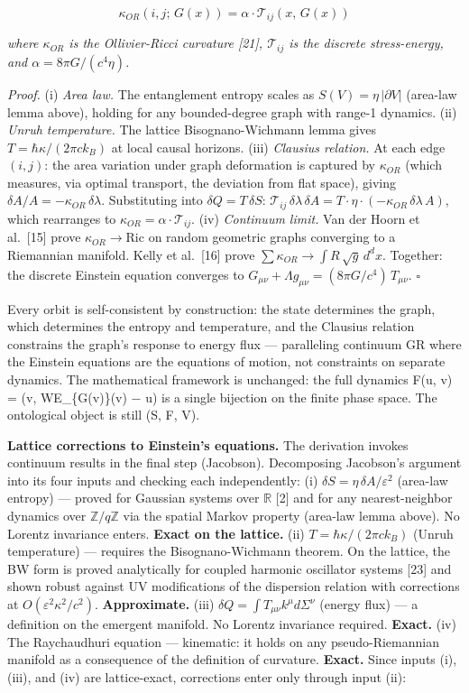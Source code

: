 \documentclass[
  11pt,
]{article}
\begin{document}
\[\kappa_{OR}(i, j;\, G(x)) = \alpha \cdot \mathcal{T}_{ij}(x,\, G(x))\]

\emph{where \(\kappa_{OR}\) is the Ollivier-Ricci curvature {[}21{]},
\(\mathcal{T}_{ij}\) is the discrete stress-energy, and
\(\alpha = 8\pi G/(c^4 \eta)\).}

\emph{Proof.} (i) \emph{Area law.} The entanglement entropy scales as
\(S(V) = \eta\,|\partial V|\) (area-law lemma above), holding for any
bounded-degree graph with range-1 dynamics. (ii) \emph{Unruh
temperature.} The lattice Bisognano-Wichmann lemma gives
\(T = \hbar\kappa/(2\pi c k_B)\) at local causal horizons. (iii)
\emph{Clausius relation.} At each edge \((i,j)\): the area variation
under graph deformation is captured by \(\kappa_{OR}\) (which measures,
via optimal transport, the deviation from flat space), giving
\(\delta A / A = -\kappa_{OR}\,\delta\lambda\). Substituting into
\(\delta Q = T\,\delta S\):
\(\mathcal{T}_{ij}\,\delta\lambda\,\delta A = T \cdot \eta \cdot (-\kappa_{OR}\,\delta\lambda\,A)\),
which rearranges to \(\kappa_{OR} = \alpha \cdot \mathcal{T}_{ij}\).
(iv) \emph{Continuum limit.} Van der Hoorn et al.~{[}15{]} prove
\(\kappa_{OR} \to \mathrm{Ric}\) on random geometric graphs converging
to a Riemannian manifold. Kelly et al.~{[}16{]} prove
\(\sum \kappa_{OR} \to \int R\,\sqrt{g}\,d^dx\). Together: the discrete
Einstein equation converges to
\(G_{\mu\nu} + \Lambda g_{\mu\nu} = (8\pi G/c^4)\,T_{\mu\nu}\).
\(\square\)

Every orbit is self-consistent by construction: the state determines the
graph, which determines the entropy and temperature, and the Clausius
relation constrains the graph's response to energy flux --- paralleling
continuum GR where the Einstein equations are the equations of motion,
not constraints on separate dynamics. The mathematical framework is
unchanged: the full dynamics F(u, v) = (v, WE\_\{G(v)\}(v) − u) is a
single bijection on the finite phase space. The ontological object is
still (S, F, V).

\textbf{Lattice corrections to Einstein's equations.} The derivation
invokes continuum results in the final step (Jacobson). Decomposing
Jacobson's argument into its four inputs and checking each
independently: (i) \(\delta S = \eta\,\delta A/\varepsilon^2\) (area-law
entropy) --- proved for Gaussian systems over \(\mathbb{R}\) {[}2{]} and
for any nearest-neighbor dynamics over \(\mathbb{Z}/q\mathbb{Z}\) via
the spatial Markov property (area-law lemma above). No Lorentz
invariance enters. \textbf{Exact on the lattice.} (ii)
\(T = \hbar\kappa/(2\pi c k_B)\) (Unruh temperature) --- requires the
Bisognano-Wichmann theorem. On the lattice, the BW form is proved
analytically for coupled harmonic oscillator systems {[}23{]} and shown
robust against UV modifications of the dispersion relation with
corrections at \(O(\varepsilon^2\kappa^2/c^2)\). \textbf{Approximate.}
(iii) \(\delta Q = \int T_{\mu\nu} k^\mu d\Sigma^\nu\) (energy flux) ---
a definition on the emergent manifold. No Lorentz invariance required.
\textbf{Exact.} (iv) The Raychaudhuri equation --- kinematic: it holds
on any pseudo-Riemannian manifold as a consequence of the definition of
curvature. \textbf{Exact.} Since inputs (i), (iii), and (iv) are
lattice-exact, corrections enter only through input (ii):
\end{document}
